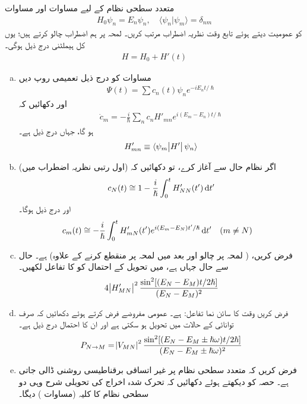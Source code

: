 متعدد سطحی نظام کے لیے مساوات  اور مساوات 
\begin{align}
	H_0\psi_n = E_n\psi_n,\quad \langle \psi_n|\psi_m \rangle = \delta_{nm}
\end{align}
کو عمومیت دیتے ہوئے تابع وقت نظریہ اضطراب مرتب کریں۔ لمحہ  پر ہم اضطراب  چالو کرتے ہیں؛ یوں کل ہیملٹنی درج ذیل ہوگی۔
\begin{align}
	H = H_0 + H'(t)
\end{align}
\begin{enumerate}[a.]
\item
 مساوات  کو درج ذیل تعمیمی روپ دیں
\begin{align}
	\Psi(t) = \sum c_n(t)\psi_ne^{-iE_nt/\hslash}
\end{align}
اور دکھائیں کہ
\begin{align}\label{مساوات_تابع_مضطرب_تفرق_شرح_مستقل}
	\dot{c}_m = -\frac{i}{\hslash}\sum_{n} c_nH'_{mn}e^{i(E_m-E_n)t/\hslash}
\end{align}
ہو گا، جہاں  درج ذیل ہے۔
\begin{align}
	H'_{mn} \equiv \langle \psi_m\abs{H'}\psi_n \rangle
\end{align}
\item
اگر نظام حال  سے آغاز کرے، تو دکھائیں کہ (اول رتبی نظریہ اضطراب میں) 
\begin{align}
	c_N(t)\cong1-\frac{i}{\hslash}\int_{0}^{t}H'_{NN}(t')\dif t'
\end{align}
اور درج ذیل ہوگا۔
\begin{align}
	c_m(t)&\cong-\frac{i}{\hslash}\int_{0}^{t}H'_{mN}(t')e^{i(E_m-E_N)t'/\hslash}\dif t'&& (m\neq N)
\end{align}
\item
 فرض کریں، ( لمحہ  پر چالو اور بعد میں لمحہ  پر منقطع کرنے کے علاوہ)   ہے۔ حال  سے حال  جہاں  ہے، میں تحویل کے احتمال کو  کا تفاعل لکھیں۔
\begin{align}
	4\abs{H'_{MN}}^2\frac{\sin^2[(E_N-E_M)t/2\hslash]}{(E_N-E_M)^2}
\end{align}
\item
 فرض کریں  وقت کا سائن نما تفاعل:  ہے۔ عمومی مفروضے فرض کرتے ہوئے دکھائیں کہ صرف توانائی  کے حالات میں تحویل ہو سکتی ہے اور ان کا احتمال درج ذیل ہے۔
\begin{align}
	P_{N\to M} = \abs{V_{MN}}^2\frac{\sin^2[(E_N-E_M\pm\hslash\omega)t/2\hslash]}{(E_N-E_M\pm\hslash\omega)^2}
\end{align}
\item
 فرض کریں کہ متعدد سطحی نظام پر غیر اتساقی برقناطیسی روشنی ڈالی جاتی ہے۔ حصہ  کو دیکھتے ہوئے دکھائیں کہ تحرک شدہ اخراج کی تحویلی شرح وہی دو سطحی نظام کا کلیہ (مساوات ) دیگا۔
 \end{enumerate}
